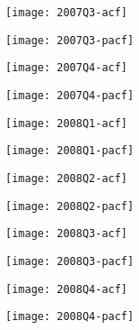 \begin{figure}[htp]
	\centering
	\begin{subfigure}{0.23\textwidth}
		\centering
		\texttt{[image: 2007Q3-acf]}
	\end{subfigure}
	\begin{subfigure}{0.23\textwidth}
		\centering
		\texttt{[image: 2007Q3-pacf]}
	\end{subfigure}
	\begin{subfigure}{0.23\textwidth}
		\centering
		\texttt{[image: 2007Q4-acf]}
	\end{subfigure}
	\begin{subfigure}{0.23\textwidth}
		\centering
		\texttt{[image: 2007Q4-pacf]}
	\end{subfigure}
\end{figure}



\begin{figure}[htp]
	\centering
	\begin{subfigure}{0.23\textwidth}
		\centering
		\texttt{[image: 2008Q1-acf]}
	\end{subfigure}
	\begin{subfigure}{0.23\textwidth}
		\centering
		\texttt{[image: 2008Q1-pacf]}
	\end{subfigure}
	\begin{subfigure}{0.23\textwidth}
		\centering
		\texttt{[image: 2008Q2-acf]}
	\end{subfigure}
	\begin{subfigure}{0.23\textwidth}
		\centering
		\texttt{[image: 2008Q2-pacf]}
	\end{subfigure}
\end{figure}

\begin{figure}[htp]
	\centering
	\begin{subfigure}{0.23\textwidth}
		\centering
		\texttt{[image: 2008Q3-acf]}
	\end{subfigure}
	\begin{subfigure}{0.23\textwidth}
		\centering
		\texttt{[image: 2008Q3-pacf]}
	\end{subfigure}
	\begin{subfigure}{0.23\textwidth}
		\centering
		\texttt{[image: 2008Q4-acf]}
	\end{subfigure}
	\begin{subfigure}{0.23\textwidth}
		\centering
		\texttt{[image: 2008Q4-pacf]}
	\end{subfigure}
\end{figure}



